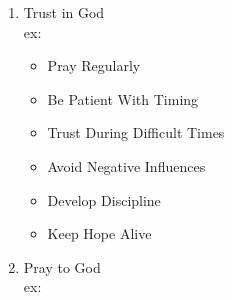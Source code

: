 \documentclass{article}%
\begin{document}
\begin{enumerate}
    \item Trust in God %
    \\ex: 
    \begin{itemize}
        \item Pray Regularly
        \item Be Patient With Timing
        \item Trust During Difficult Times
        \item Avoid Negative Influences
        \item Develop Discipline
        \item Keep Hope Alive
    \end{itemize}
    \item Pray to God
    \\ex:
    

\end{enumerate}
\end{document}
